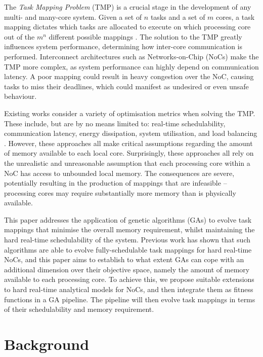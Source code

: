 \documentclass[conference]{IEEEtran}
\begin{document}
The \textit{Task Mapping Problem} (TMP) is a crucial stage in the development of any multi- and many-core system. Given a set of $n$ tasks and a set of $m$ cores, a task mapping dictates which tasks are allocated to execute on which processing core out of the $m^n$ different possible mappings \cite{tindell1992allocating}. The solution to the TMP greatly influences system performance, determining how inter-core communication is performed. Interconnect architectures such as Networks-on-Chip (NoCs) make the TMP more complex, as system performance can highly depend on communication latency. A poor mapping could result in heavy congestion over the NoC, causing tasks to miss their deadlines, which could manifest as undesired or even unsafe behaviour.

Existing works consider a variety of optimisation metrics when solving the TMP. These include, but are by no means limited to: real-time schedulability, communication latency, energy dissipation, system utilisation, and load balancing \cite{singh2013mapping}. However, these approaches all make critical assumptions regarding the amount of memory available to each local core. Surprisingly, these approaches all rely on the unrealistic and unreasonable assumption that each processing core within a NoC has access to unbounded local memory. The consequences are severe, potentially resulting in the production of mappings that are infeasible -- processing cores may require substantially more memory than is physically available.

This paper addresses the application of genetic algorithms (GAs) to evolve task mappings that minimise the overall memory requirement, whilst maintaining the hard real-time schedulability of the system. Previous work has shown that such algorithms are able to evolve fully-schedulable task mappings for hard real-time NoCs, and this paper aims to establish to what extent GAs can cope with an additional dimension over their objective space, namely the amount of memory available to each processing core. To achieve this, we propose suitable extensions to hard real-time analytical models for NoCs, and then integrate them as fitness functions in a GA pipeline. The pipeline will then evolve task mappings in terms of their schedulability and memory requirement.

\section{Background}\label{background}
\end{document}

